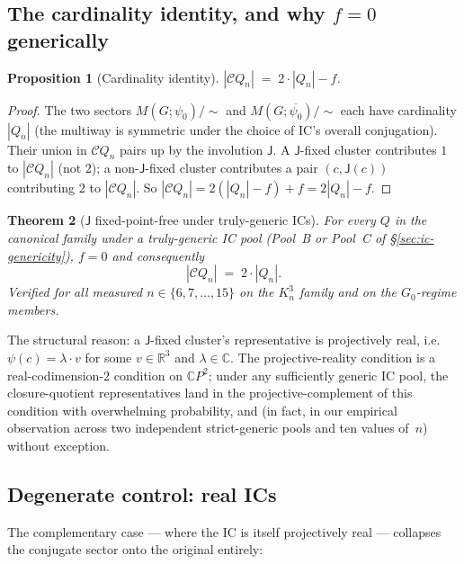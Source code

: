 \documentclass[12pt,a4paper]{article}
\newtheorem{theorem}{Theorem}[section]
\newtheorem{proposition}[theorem]{Proposition}
\theoremstyle{definition}
\theoremstyle{remark}
\newcommand{\bC}{\mathbb{C}}
\newcommand{\bR}{\mathbb{R}}
\newcommand{\Kn}{K_n^3}
\newcommand{\Qn}{Q_n}
\newcommand{\Ccls}{\mathcal{C}}             %
\newcommand{\Jconj}{\mathsf{J}}             %
\begin{document}
\subsection{The cardinality identity, and why $f = 0$ generically}
\label{sec:J-identity}

\begin{proposition}[Cardinality identity]\label{prop:J-identity}
$|\Ccls\Qn| \;=\; 2 \cdot |\Qn| - f$.
\end{proposition}

\begin{proof}
The two sectors $M(G; \psi_0)/{\sim}$ and $M(G; \overline{\psi_0})/{\sim}$
each have cardinality $|\Qn|$ (the multiway is symmetric under the
choice of IC's overall conjugation). Their union in $\Ccls\Qn$ pairs
up by the involution $\Jconj$. A $\Jconj$-fixed cluster contributes
$1$ to $|\Ccls\Qn|$ (not $2$); a non-$\Jconj$-fixed cluster
contributes a pair $(c, \Jconj(c))$ contributing $2$ to $|\Ccls\Qn|$.
So $|\Ccls\Qn| = 2(|\Qn| - f) + f = 2|\Qn| - f$.
\end{proof}

\begin{theorem}[$\Jconj$ fixed-point-free under truly-generic ICs]
\label{thm:J-free}
For every $Q$ in the canonical family under a truly-generic IC pool
(Pool~B or Pool~C of \S\ref{sec:ic-genericity}), $f = 0$ and
consequently
\[
|\Ccls\Qn| \;=\; 2 \cdot |\Qn|.
\]
Verified for all measured $n \in \{6, 7, \dots, 15\}$ on the $\Kn$
family and on the $G_0$-regime members.
\end{theorem}

The structural reason: a $\Jconj$-fixed cluster's representative is
projectively real, i.e.\ $\psi(c) = \lambda \cdot v$ for some
$v \in \bR^3$ and $\lambda \in \bC$. The projective-reality condition
is a real-codimension-$2$ condition on $\bC P^2$; under any
sufficiently generic IC pool, the closure-quotient representatives
land in the projective-complement of this condition with overwhelming
probability, and (in fact, in our empirical observation across two
independent strict-generic pools and ten values of~$n$) without
exception.

\subsection{Degenerate control: real ICs}\label{sec:J-degenerate}

The complementary case --- where the IC is itself projectively real ---
collapses the conjugate sector onto the original entirely:
\end{document}
